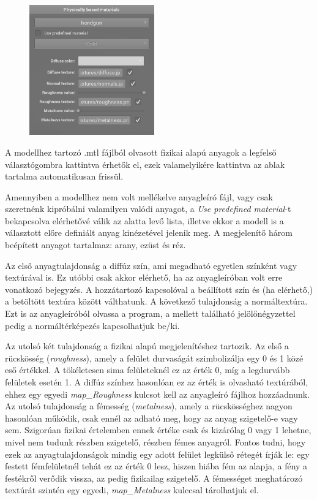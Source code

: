 \begin{figure}
    \vspace{-23pt}
    \includegraphics[width=0.48\textwidth]{images/pbr_materials.png}
    \vspace{-20pt}
\end{figure}

A modellhez tartozó .mtl fájlból olvasott fizikai alapú anyagok a legfelső választógombra kattintva érhetők el, ezek valamelyikére kattintva az ablak tartalma automatikusan frissül.

Amennyiben a modellhez nem volt mellékelve anyagleíró fájl, vagy csak szeretnénk kipróbálni valamilyen valódi anyagot, a \textit{Use predefined material}-t bekapcsolva elérhetővé válik az alatta levő lista, illetve ekkor a modell is a választott előre definiált anyag kinézetével jelenik meg. A megjelenítő három beépített anyagot tartalmaz: arany, ezüst és réz.

Az első anyagtulajdonság a diffúz szín, ami megadható egyetlen színként vagy textúrával is. Ez utóbbi csak akkor elérhető, ha az anyagleíróban volt erre vonatkozó bejegyzés. A hozzátartozó kapcsolóval a beállított szín és (ha elérhető,) a betöltött textúra között válthatunk. A következő tulajdonság a normáltextúra. Ezt is az anyagleíróból olvassa a program, a mellett található jelölőnégyzettel pedig a normáltérképezés kapcsolhatjuk be/ki.

Az utolsó két tulajdonság a fizikai alapú megjelenítéshez tartozik. Az első a rücskösség (\textit{roughness}), amely a felület durvaságát szimbolizálja egy 0 és 1 közé eső értékkel. A tökéletesen sima felületeknél ez az érték 0, míg a legdurvább felületek esetén 1. A diffúz színhez hasonlóan ez az érték is olvasható textúrából, ehhez egy egyedi \textit{map\_Roughness} kulcsot kell az anyagleíró fájlhoz hozzáadnunk. Az utolsó tulajdonság a fémesség (\textit{metalness}), amely a rücskösséghez nagyon hasonlóan működik, csak ennél az adható meg, hogy az anyag szigetelő-e vagy sem. Szigorúan fizikai értelemben ennek értéke csak és kizárólag 0 vagy 1 lehetne, mivel nem tudunk részben szigetelő, részben fémes anyagról. Fontos tudni, hogy ezek az anyagtulajdonságok mindig egy adott felület legkülső rétegét írják le: egy festett fémfelületnél tehát ez az érték 0 lesz, hiszen hiába fém az alapja, a fény a festékről verődik vissza, az pedig fizikailag szigetelő. A fémességet meghatározó textúrát szintén egy egyedi, \textit{map\_Metalness} kulccsal tárolhatjuk el.

